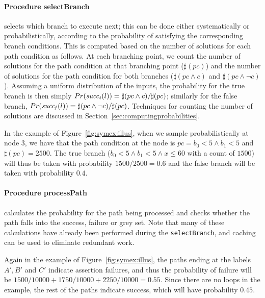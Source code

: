 \paragraph{Procedure selectBranch} selects which branch to execute next; this can be done either systematically or probabilistically, 
according to the probability of satisfying the corresponding branch conditions. This is computed based on the number of solutions for each path condition as follows.
At each branching point, we count the number of solutions for the path condition at that branching point ($\sharp(pc)$) and the number of solutions for the path condition for both branches ($\sharp(pc \wedge c)$ and $\sharp(pc \wedge \neg c)$). Assuming a uniform distribution of the inputs, the probability for the true branch is then simply  $Pr(\mathit{succ_t}(l)) = \sharp(pc \wedge c)/\sharp(pc)$; similarly
for the false branch, $Pr(\mathit{succ_f}(l)) = \sharp(pc \wedge \neg c)/\sharp(pc)$.  Techniques for counting the number of solutions are discussed in Section~\ref{sec:computingprobabilities}.

In the example of Figure~\ref{fig:symex:illus}, when we sample probabilistically at node $3$, we have that the path condition at the node is $pc = b_0 < 5 \wedge b_1 < 5$ and $\sharp(pc) = 2500$. 
The true branch ($b_0 < 5 \wedge b_1 < 5 \wedge x \le 60$ with a count of $1500$) will thus be taken with probability $1500/2500 = 0.6$ and the false branch will be taken with probability $0.4$.  

\paragraph{Procedure processPath} calculates the probability for the path being processed and checks whether the path falls into the success, failure or grey set. Note that many of these calculations have already been performed during the {\tt selectBranch}, and caching can be used to eliminate redundant work. 

Again in the example of Figure~\ref{fig:symex:illus}, the paths ending at the labels $A', B'$ and $C'$ indicate assertion failures, and thus the probability of failure will be $1500/10000 + 1750/10000 + 2250/10000 = 0.55$.  Since there are no loops in the example, the rest of the paths indicate success, which will have probability $0.45$.

